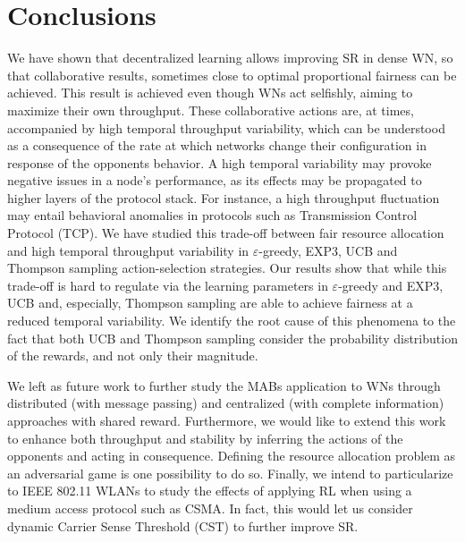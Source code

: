 \documentclass[10pt,journal,compsoc]{IEEEtran}
\begin{document}
	\section{Conclusions }
	\label{section:conclusions}
	We have shown that decentralized learning allows improving SR in dense WN, so that collaborative results, sometimes close to optimal proportional fairness can be achieved. This result is achieved even though WNs act selfishly, aiming to maximize their own throughput. %
	These collaborative actions are, at times, accompanied by high temporal throughput variability, which can be understood as a consequence of the  rate at which networks change their configuration in response of the opponents behavior. A high temporal variability may provoke negative issues in a node's performance, as its effects may be propagated to higher layers of the protocol stack. For instance, a high throughput fluctuation may entail behavioral anomalies in protocols such as Transmission Control Protocol (TCP). %
	We have studied this trade-off between fair resource allocation and high temporal throughput variability in $\varepsilon$-greedy, EXP3, UCB and Thompson sampling action-selection strategies. Our results show that while this trade-off is hard to regulate via the learning parameters in $\varepsilon$-greedy and EXP3, UCB  and, especially, Thompson sampling are able to achieve fairness at a reduced temporal variability. We identify the root cause of this phenomena to the fact that both UCB and Thompson sampling consider the probability distribution of the rewards, and not only their magnitude.
	
	We left as future work to further study the MABs application to WNs through distributed (with message passing) and centralized (with complete information) approaches with shared reward. Furthermore, we would like to extend this work to enhance both throughput and stability by inferring the actions of the opponents and acting in consequence. Defining the resource allocation problem as an adversarial game is one possibility to do so. Finally, we intend to particularize to IEEE 802.11 WLANs to study the effects of applying RL when using a medium access protocol such as CSMA. In fact, this would let us consider dynamic Carrier Sense Threshold (CST) to further improve SR.
	
\end{document}
